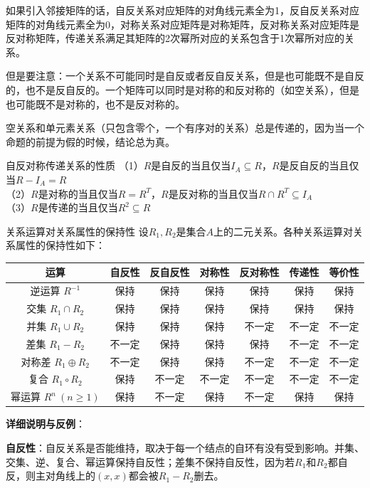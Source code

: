 如果引入邻接矩阵的话，自反关系对应矩阵的对角线元素全为1，反自反关系对应矩阵的对角线元素全为0，对称关系对应矩阵是对称矩阵，反对称关系对应矩阵是反对称矩阵，传递关系满足其矩阵的2次幂所对应的关系包含于1次幂所对应的关系。

但是要注意：一个关系不可能同时是自反或者反自反关系，但是也可能既不是自反的，也不是反自反的。一个矩阵可以同时是对称的和反对称的（如空关系），但是也可能既不是对称的，也不是反对称的。

空关系和单元素关系（只包含零个，一个有序对的关系）总是传递的，因为当一个命题的前提为假的时候，结论总为真。
\begin{theorem}{自反对称传递关系的性质}{}
（1）$R$是自反的当且仅当$I_A\subseteq R$，$R$是反自反的当且仅当$R-I_A=R$\\
（2）$R$是对称的当且仅当$R=R^T$，$R$是反对称的当且仅当$R\cap R^T\subseteq I_A$\\
（3）$R$是传递的当且仅当$R^2\subseteq R$
\end{theorem}
\begin{theorem}{关系运算对关系属性的保持性}{}
设$R_1, R_2$是集合$A$上的二元关系。各种关系运算对关系属性的保持性如下：
\begin{center}
\begin{tabular}{|c|c|c|c|c|c|c|}
\hline
运算 & 自反性 & 反自反性 & 对称性 & 反对称性 & 传递性 & 等价性 \\
\hline
逆运算 $R^{-1}$ & 保持 & 保持 & 保持 & 保持 & 保持 & 保持 \\
\hline
交集 $R_1 \cap R_2$ & 保持 & 保持 & 保持 & 保持 & 保持 & 保持 \\
\hline
并集 $R_1 \cup R_2$ & 保持 & 保持 & 保持 & 不一定 & 不一定 & 不一定 \\
\hline
差集 $R_1 - R_2$ & 不一定 & 保持 & 保持 & 保持 & 不一定 & 不一定 \\
\hline
对称差 $R_1 \oplus R_2$ & 不一定 & 保持 & 保持 & 不一定 & 不一定 & 不一定 \\
\hline
复合 $R_1 \circ R_2$ & 保持 & 不一定 & 不一定 & 不一定 & 不一定 & 不一定 \\
\hline
幂运算 $R^n~(n\geqslant1)$ & 保持 & 不一定 & 保持 & 不一定 & 保持 & 保持 \\
\hline
\end{tabular}
\end{center}
\end{theorem}
\textbf{详细说明与反例}：

\textbf{自反性}：自反关系是否能维持，取决于每一个结点的自环有没有受到影响。并集、交集、逆、复合、幂运算保持自反性；差集不保持自反性，因为若$R_1$和$R_2$都自反，则主对角线上的$(x,x)$都会被$R_1-R_2$删去。

